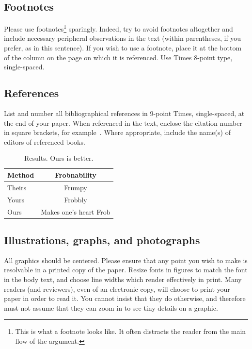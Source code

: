 \documentclass[10pt,twocolumn,letterpaper]{article}
\begin{document}
\subsection{Footnotes}

Please use footnotes\footnote {This is what a footnote looks like.  It
often distracts the reader from the main flow of the argument.} sparingly.
Indeed, try to avoid footnotes altogether and include necessary peripheral
observations in
the text (within parentheses, if you prefer, as in this sentence).  If you
wish to use a footnote, place it at the bottom of the column on the page on
which it is referenced. Use Times 8-point type, single-spaced.


\subsection{References}

List and number all bibliographical references in 9-point Times,
single-spaced, at the end of your paper. When referenced in the text,
enclose the citation number in square brackets, for
example~\cite{Authors14}.  Where appropriate, include the name(s) of
editors of referenced books.

\begin{table}
\begin{center}
\begin{tabular}{|l|c|}
\hline
Method & Frobnability \\
\hline\hline
Theirs & Frumpy \\
Yours & Frobbly \\
Ours & Makes one's heart Frob\\
\hline
\end{tabular}
\end{center}
\caption{Results.   Ours is better.}
\end{table}

\subsection{Illustrations, graphs, and photographs}

All graphics should be centered.  Please ensure that any point you wish to
make is resolvable in a printed copy of the paper.  Resize fonts in figures
to match the font in the body text, and choose line widths which render
effectively in print.  Many readers (and reviewers), even of an electronic
copy, will choose to print your paper in order to read it.  You cannot
insist that they do otherwise, and therefore must not assume that they can
zoom in to see tiny details on a graphic.
\end{document}
